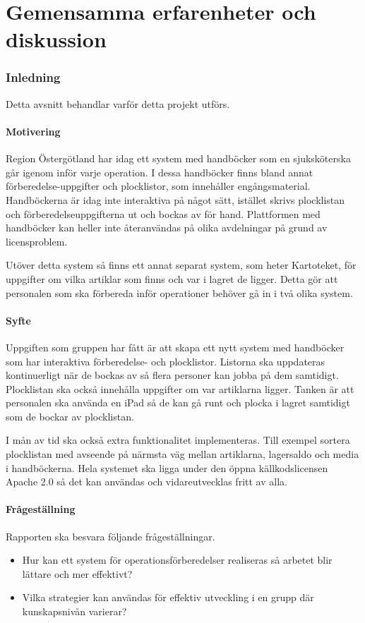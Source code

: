\documentclass{article}
\begin{document}
\newpage
\tableofcontents
\newpage
{}

\part{Gemensamma erfarenheter och diskussion}

\section{Inledning}
Detta avsnitt behandlar varför detta projekt utförs.

\subsection{Motivering}
Region Östergötland har idag ett system med handböcker som en sjuksköterska går igenom inför varje operation. I dessa handböcker finns bland annat förberedelse-uppgifter och plocklistor, som innehåller engångsmaterial. Handböckerna är idag inte interaktiva på något sätt, istället skrivs plocklistan och förberedelse\-uppgifterna ut och bockas av för hand. Plattformen med handböcker kan heller inte återanvändas på olika avdelningar på grund av licensproblem. 

Utöver detta system så finns ett annat separat system, som heter Kartoteket, för uppgifter om vilka artiklar som finns och var i lagret de ligger. Detta gör att personalen som ska förbereda inför operationer behöver gå in i två olika system. 

\subsection{Syfte}
Uppgiften som gruppen har fått är att skapa ett nytt system med handböcker som har interaktiva förberedelse- och plocklistor. Listorna ska uppdateras kontinuerligt när de bockas av så flera personer kan jobba på dem samtidigt. Plocklistan ska också innehålla uppgifter om var artiklarna ligger. Tanken är att personalen 
ska använda en iPad så de kan gå runt och plocka i lagret samtidigt som de bockar av plocklistan.

I mån av tid ska också extra funktionalitet implementeras. Till exempel sortera plocklistan med avseende på närmsta väg mellan artiklarna, lagersaldo och media i handböckerna.
Hela systemet ska ligga under den öppna källkodslicensen Apache 2.0 \cite{apache} så det kan användas och vidareutvecklas fritt av alla.    

\subsection{Frågeställning}
Rapporten ska besvara följande frågeställningar.
\begin{itemize}
\item Hur kan ett system för operationsförberedelser realiseras så arbetet blir lättare och mer effektivt?
\item Vilka strategier kan användas för effektiv utveckling i en grupp där kunskapsnivån varierar? 
\end{itemize}
\end{document}
